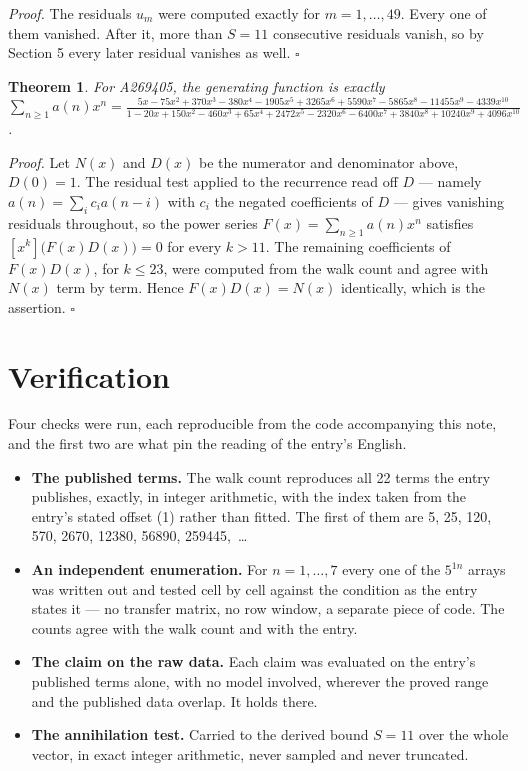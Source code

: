 \documentclass[11pt]{article}
\newtheorem{theorem}{Theorem}
\theoremstyle{definition}
\begin{document}
{\itshape Proof.} The residuals $u_m$ were computed exactly for $m = 1,\dots,49$. Every one of them vanished. After it, more than $S = 11$ consecutive residuals vanish, so by Section 5 every later residual vanishes as well. $\square$

\begin{theorem} For A269405, the generating function is exactly $\sum_{n\ge 1} a(n)x^n = \frac{5x - 75x^{2} + 370x^{3} - 380x^{4} - 1905x^{5} + 3265x^{6} + 5590x^{7} - 5865x^{8} - 11455x^{9} - 4339x^{10}}{1 - 20x + 150x^{2} - 460x^{3} + 65x^{4} + 2472x^{5} - 2320x^{6} - 6400x^{7} + 3840x^{8} + 10240x^{9} + 4096x^{10}}$.\end{theorem}

{\itshape Proof.} Let $N(x)$ and $D(x)$ be the numerator and denominator above, $D(0)=1$. The residual test applied to the recurrence read off $D$ --- namely $a(n) = \sum_i c_i a(n-i)$ with $c_i$ the negated coefficients of $D$ --- gives vanishing residuals throughout, so the power series $F(x)=\sum_{n\ge 1}a(n)x^n$ satisfies $[x^k]\bigl(F(x)D(x)\bigr) = 0$ for every $k > 11$. The remaining coefficients of $F(x)D(x)$, for $k \le 23$, were computed from the walk count and agree with $N(x)$ term by term. Hence $F(x)D(x) = N(x)$ identically, which is the assertion. $\square$

\section{Verification}

Four checks were run, each reproducible from the code accompanying this note, and the first two are what pin the reading of the entry's English.

\begin{itemize}

\item {\bfseries The published terms.} The walk count reproduces all 22 terms the entry publishes, exactly, in integer arithmetic, with the index taken from the entry's stated offset (1) rather than fitted. The first of them are 5, 25, 120, 570, 2670, 12380, 56890, 259445,~\dots

\item {\bfseries An independent enumeration.} For $n = 1,\dots,7$ every one of the $5^{1n}$ arrays was written out and tested cell by cell against the condition as the entry states it --- no transfer matrix, no row window, a separate piece of code. The counts agree with the walk count and with the entry.

\item {\bfseries The claim on the raw data.} Each claim was evaluated on the entry's published terms alone, with no model involved, wherever the proved range and the published data overlap. It holds there.

\item {\bfseries The annihilation test.} Carried to the derived bound $S = 11$ over the whole vector, in exact integer arithmetic, never sampled and never truncated.

\end{itemize}
\end{document}
